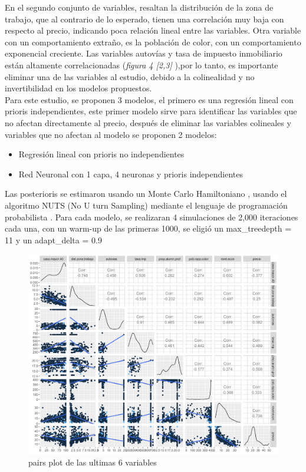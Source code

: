 \documentclass[nojss]{jss}
\begin{document}
En el segundo conjunto de variables, resaltan la distribución de la zona de trabajo, que al contrario de lo esperado, tienen una correlación muy baja con respecto al precio, indicando poca relación lineal entre las variables. Otra variable con un comportamiento extraño, es la población de color, con un comportamiento exponencial creciente. Las variables autovías y tasa de impuesto inmobiliario están altamente correlacionadas (\textit{figura 4 [2,3]} ),por lo tanto, es importante eliminar una de las variables al estudio, debido a la colinealidad y no invertibilidad en los modelos propuestos. \\  

Para este estudio, se proponen 3 modelos, el primero es una regresión lineal con prioris independientes, este primer modelo sirve para identificar las variables que no afectan directamente al precio, después de eliminar las variables colineales y variables que no afectan al modelo se proponen 2 modelos:
\begin{itemize}
	\item Regresión lineal con prioris no independientes
	\item Red Neuronal con 1 capa, 4 neuronas y prioris independientes
\end{itemize}

Las posterioris se estimaron usando un Monte Carlo Hamiltoniano \cite{DUANE1987216} \cite{betancourt2017}, usando el algoritmo NUTS (No U turn Sampling) \cite{hoffman14a} mediante el lenguaje de programación probabilista \cite{Stan}. Para cada modelo, se realizaran 4 simulaciones de 2,000 iteraciones cada una, con un warm-up de las primeras 1000, se eligió un max\_treedepth = 11 y un adapt\_delta = 0.9

\begin{figure}[H]
	\centering
	\includegraphics[scale=1]{images/pairs2-1}
	\caption[pairs]{pairs plot de las ultimas 6 variables}
	\label{fig:fig4}
\end{figure}  
\end{document}
